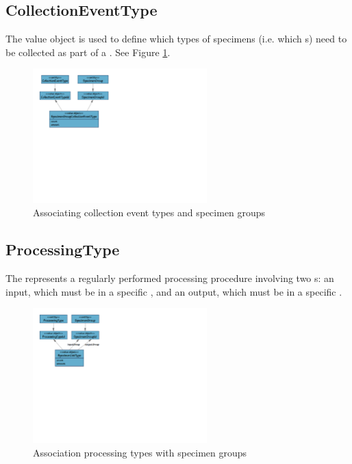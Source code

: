 \subsection{CollectionEventType}
\label{sec:collection-event-type}

The \texttt{\textbf{}} value
object is used to define which types of specimens (i.e. which
s) need to be collected as part of a
. See Figure \ref{fig:collection-event-type}.

\begin{figure}[h]
  \centering
  \includegraphics[trim={9mm 118mm 158mm 9mm}, clip,
    width=0.6\textwidth]{images/collection-event-type}
  \caption{Associating collection event types and specimen groups}
  \label{fig:collection-event-type}
\end{figure}

\subsection{ProcessingType}
\label{sec:Processing-type}

The \texttt{\textbf{}} represents a regularly
performed processing procedure involving two s: an input,
which must be in a specific , and an output, which
must be in a specific .

\begin{figure}[h]
  \centering
  \includegraphics[trim={9mm 120mm 172mm 9mm}, clip,
    width=0.6\textwidth]{images/processing-type}
  \caption{Association processing types with specimen groups}
  \label{fig:processing-type}
\end{figure}

